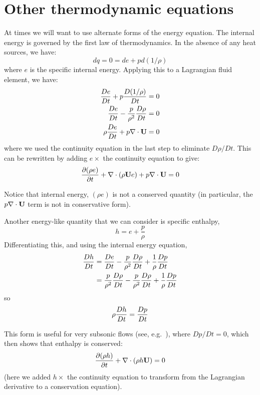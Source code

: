 \section{Other thermodynamic equations}

At times we will want to use alternate forms of the energy equation.  The
internal energy is governed by the first law of thermodynamics.  In the
absence of any heat sources, we have:
\begin{equation}
dq = 0 = de + pd(1/\rho)
\end{equation}
where $e$ is the specific internal energy.
Applying this to a Lagrangian fluid element, we have:
\begin{align}
{\frac{{De}}{D t}} + p {\frac{{D(1/\rho)}}{D t}} &= 0 \\
{\frac{{De}}{D t}} - \frac{p}{\rho^2} \frac{D\rho}{Dt} &= 0 \\
\rho \frac{De}{Dt} + p \nabla \cdot {\bf U} &= 0
\end{align}
where we used the continuity equation in the last step to eliminate
$D\rho/Dt$.  This can be rewritten by adding $e \times$ the continuity
equation to give:
\begin{equation}
{\frac{{\partial(\rho e)}}{\partial t}} + \nabla \cdot (\rho {\bf U} e) + p \nabla \cdot {\bf U} = 0 \label{eq:euler:econs}
\end{equation}

Notice that internal energy, $(\rho e)$ is not a conserved quantity
(in particular, the $p\nabla \cdot {\bf U}$ term is not in conservative
form).  

Another energy-like quantity that we can consider is specific enthalpy,
\begin{equation}
h = e + \frac{p}{\rho}
\end{equation}
Differentiating this, and using the internal energy equation,
\begin{align}
{\frac{{Dh}}{D t}} &= {\frac{{De}}{D t}} - \frac{p}{\rho^2} {\frac{{D\rho}}{D t}} + \frac{1}{\rho} {\frac{{Dp}}{D t}} \\
        &= \frac{p}{\rho^2}{\frac{{D\rho}}{D t}} - \frac{p}{\rho^2} {\frac{{D\rho}}{D t}} + \frac{1}{\rho} {\frac{{Dp}}{D t}}
\end{align}
so
\begin{equation}
\rho {\frac{{Dh}}{D t}} = {\frac{{Dp}}{D t}}
\end{equation}

This form is useful for very subsonic flows (see,
e.g.~\cite{SNpaper}), where $Dp/Dt = 0$, which then shows that
enthalpy is conserved:
\begin{equation}
{\frac{{\partial(\rho h)}}{\partial t}} + \nabla \cdot (\rho h {\bf U}) = 0
\end{equation}
(here we added $h \times$ the continuity equation to transform from
the Lagrangian derivative to a conservation equation).


